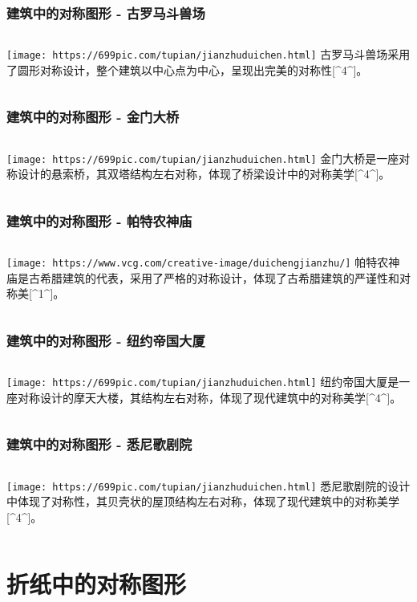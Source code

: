 \documentclass{ctexbeamer}
\begin{document}
\begin{frame}
\frametitle{建筑中的对称图形 - 古罗马斗兽场}
\begin{columns}
\texttt{[image: https://699pic.com/tupian/jianzhuduichen.html]}
古罗马斗兽场采用了圆形对称设计，整个建筑以中心点为中心，呈现出完美的对称性[^4^]。
\end{columns}
\end{frame}

\begin{frame}
\frametitle{建筑中的对称图形 - 金门大桥}
\begin{columns}
\texttt{[image: https://699pic.com/tupian/jianzhuduichen.html]}
金门大桥是一座对称设计的悬索桥，其双塔结构左右对称，体现了桥梁设计中的对称美学[^4^]。
\end{columns}
\end{frame}

\begin{frame}
\frametitle{建筑中的对称图形 - 帕特农神庙}
\begin{columns}
\texttt{[image: https://www.vcg.com/creative-image/duichengjianzhu/]}
帕特农神庙是古希腊建筑的代表，采用了严格的对称设计，体现了古希腊建筑的严谨性和对称美[^1^]。
\end{columns}
\end{frame}

\begin{frame}
\frametitle{建筑中的对称图形 - 纽约帝国大厦}
\begin{columns}
\texttt{[image: https://699pic.com/tupian/jianzhuduichen.html]}
纽约帝国大厦是一座对称设计的摩天大楼，其结构左右对称，体现了现代建筑中的对称美学[^4^]。
\end{columns}
\end{frame}

\begin{frame}
\frametitle{建筑中的对称图形 - 悉尼歌剧院}
\begin{columns}
\texttt{[image: https://699pic.com/tupian/jianzhuduichen.html]}
悉尼歌剧院的设计中体现了对称性，其贝壳状的屋顶结构左右对称，体现了现代建筑中的对称美学[^4^]。
\end{columns}
\end{frame}

\section{折纸中的对称图形}
\end{document}
